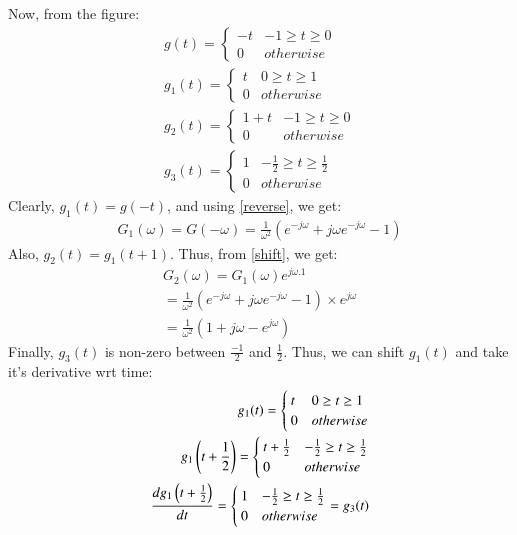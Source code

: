 \documentclass[journal,12pt,twocolumn]{IEEEtran}
\begin{document}
Now, from the figure:
\begin{align}
    g(t) = 
    \begin{cases}
    -t & -1 \geq t \geq 0\\
    0 & otherwise
    \end{cases}\\
    g_1(t) = 
    \begin{cases}
    t & 0 \geq t \geq 1\\
    0 & otherwise
    \end{cases}\\
    g_2(t) = 
    \begin{cases}
    1+t & -1 \geq t \geq 0\\
    0 & otherwise
    \end{cases}\\
    g_3(t) = 
    \begin{cases}
    1 & -\frac{1}{2} \geq t \geq \frac{1}{2}\\
    0 & otherwise
    \end{cases}
\end{align}
Clearly, $g_1(t) = g(-t)$, and using \eqref{reverse}, we get:
\begin{align}
    G_1(\omega) = G(-\omega) = \frac{1}{\omega^2}(e^{-j\omega} + j\omega e^{-j\omega} - 1)
\end{align}
Also, $g_2(t) = g_1(t + 1)$. Thus, from \eqref{shift}, we get:
\begin{align}
    G_2(\omega) = G_1(\omega)e^{j\omega.1} \\ =\frac{1}{\omega^2}(e^{-j\omega} + j\omega e^{-j\omega} - 1) \times e^{j\omega}\\
    =\frac{1}{\omega^2}(1 + j\omega - e^{j\omega})
\end{align}
Finally, $g_3(t)$ is non-zero between $\frac{-1}{2}$ and $\frac{1}{2}$. Thus, we can shift $g_1(t)$ and take it's derivative wrt time:
\begin{align}
    g_1(t) = 
    \begin{cases}
    t & 0 \geq t \geq 1\\
    0 & otherwise
    \end{cases}\\
    g_1\left(t + \frac{1}{2}\right) = 
    \begin{cases}
    t + \frac{1}{2} & -\frac{1}{2} \geq t \geq \frac{1}{2}\\
    0 & otherwise
    \end{cases}\\
    \frac{dg_1\left(t + \frac{1}{2}\right)}{dt} = 
    \begin{cases}
    1 & -\frac{1}{2} \geq t \geq \frac{1}{2}\\
    0 & otherwise
    \end{cases} = g_3(t)
\end{align}
\end{document}
